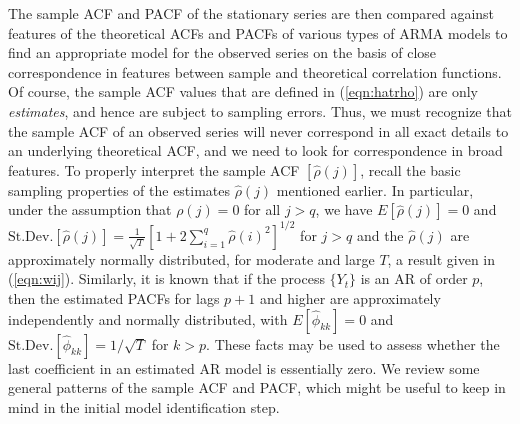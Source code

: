 The sample ACF and PACF of the stationary series are then compared against features of the theoretical ACFs and PACFs of various types of ARMA models to find an appropriate model for the observed series on the basis of close correspondence in features between sample and theoretical correlation functions. Of course, the sample ACF values that are defined in (\ref{eqn:hatrho}) are only \textit{estimates}, and hence are subject to sampling errors. Thus, we must recognize that the sample ACF of an observed series will never correspond in all exact details to an underlying theoretical ACF, and we need to look for correspondence in broad features. To properly interpret the sample ACF $[\hat{\rho}(j)]$, recall the basic sampling properties of the estimates $\hat{\rho}(j)$ mentioned earlier. In particular, under the assumption that $\rho(j) = 0$ for all $j > q$, we have $E[\hat{\rho}(j)]=0$ and $\text{St.Dev.}[\hat{\rho}(j)]=\frac{1}{\sqrt{T}}[1 + 2\sum_{i=1}^q\hat{\rho}(i)^2]^{1/2}$ for $j>q$ and the $\hat{\rho}(j)$ are approximately normally distributed, for moderate and large $T$, a result given in (\ref{eqn:wij}). Similarly, it is known that if the process $\{Y_t\}$ is an AR of order $p$, then the estimated PACFs for lags $p+1$ and higher are approximately independently and normally distributed, with $E[\hat{\phi}_{kk}] = 0$ and $\text{St.Dev.}[\hat{\phi}_{kk}] = 1/\sqrt{T}$ for $k>p$. These facts may be used to assess whether the last coefficient in an estimated AR model is essentially zero. We review some general patterns of the sample ACF and PACF, which might be useful to keep in mind in the initial model identification step. 


